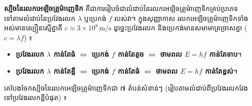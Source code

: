 \vspace{0.6em}

\noindent
\textbf{ស្បិចនៃរលកអេឡិចត្រូម៉ាញេទិក} គឺជាការរៀបចំជាលំដាប់នៃរលកអេឡិចត្រូម៉ាញេទិកគ្រប់ប្រភេទ ទៅតាមលំដាប់នៃប្រវែងរលក $\lambda$ ឬប្រេកង់ $f$ របស់វា។ ក្នុងសុញ្ញាកាស រលកអេឡិចត្រូម៉ាញេទិកទាំងអស់មានល្បឿនស្មើគ្នាគឺ $c \approx 3 \times 10^8\,\text{m/s}$ ដូច្នេះប្រវែងរលក និងប្រេកង់មានសមាមាត្រច្រាសគ្នា ($c = \lambda f$) ៖
\begin{itemize}[itemsep=2pt, topsep=1pt, leftmargin=1.6em]
	\item \textbf{ប្រវែងរលក $\lambda$ កាន់តែធំ $\iff$ ប្រេកង់ $f$ កាន់តែតូច $\iff$ ថាមពល $E = hf$ កាន់តែទាប}។
	\item \textbf{ប្រវែងរលក $\lambda$ កាន់តែខ្លី $\iff$ ប្រេកង់ $f$ កាន់តែធំ $\iff$ ថាមពល $E = hf$ កាន់តែខ្ពស់}។
\end{itemize}

\vspace{0.3em}
\noindent
គេបែងចែកស្បិចនៃរលកអេឡិចត្រូម៉ាញេទិកជា ៧ តំបន់សំខាន់ៗ (រៀបតាមលំដាប់ពីប្រវែងរលកវែង ទៅប្រវែងរលកខ្លីបំផុត) ៖


